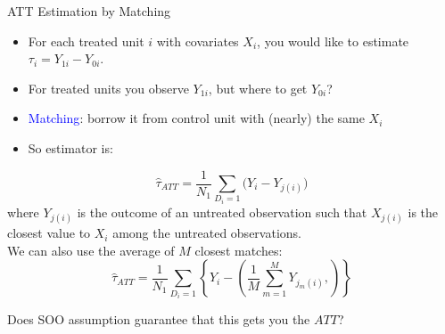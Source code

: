 \documentclass[xcolor=dvipsnames]{beamer}
\newcommand\E{\mathbb{E}}
\begin{document}
\begin{frame}{ATT Estimation by Matching}
\small
\begin{itemize} 
\item<1-> For each treated unit $i$ with covariates $X_i$, you would like to estimate $\tau_i=Y_{1i}-Y_{0i}$. 
\item<2-> For treated units you observe $Y_{1i}$, but where to get $Y_{0i}$? 
\item<3-> \textcolor{Blue}{Matching}: borrow it from control unit with (nearly) the same $X_i$ 
\item<4-> So estimator is:
\end{itemize}
 \[
\widehat{\tau}_{ATT}= \frac{1}{N_1} \sum_{D_i=1}
\big(Y_i - Y_{j(i)}\big)
\] \footnotesize where $Y_{j(i)}$ is the outcome of an untreated observation such that
$X_{j(i)}$ is the \alert{closest} value to $X_i$ among the untreated
observations.\\
\small
\medskip 
{} We can also use the average of $M$ closest matches: \[
\widehat{\tau}_{ATT}= \frac{1}{N_1} \sum_{D_i=1} \left\{ Y_i -
\left(\frac{1}{M}\sum_{m=1}^M Y_{j_m(i)},\right)\right\}
\] 

 Does SOO assumption guarantee that this gets you the $ATT$?
\end{frame}
\end{document}
